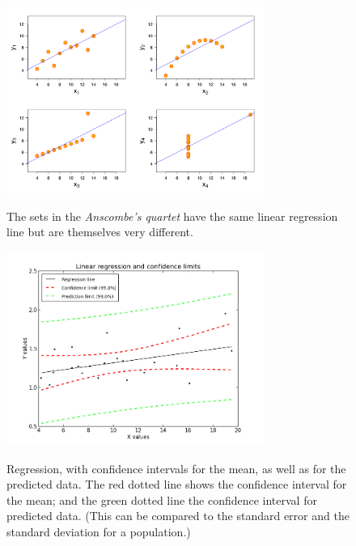 \begin{figure}
  \centering
  \includegraphics[width=0.75\textwidth]{../Images/Anscombes_quartet.png}\\
  \caption{The sets in the \emph{Anscombe's quartet} have the same linear regression line but are themselves very different.}
\end{figure}



\begin{figure}
  \centering
  \includegraphics[width=0.75\textwidth]{../Images/regression_wLegend.png}\\
  \caption{Regression, with confidence intervals for the mean, as well as for the predicted data. The red dotted line shows the confidence interval for the mean; and the green dotted line the confidence interval for predicted data. (This can be compared to the standard error and the standard deviation for a population.)} \label{fig:regline}
\end{figure}

